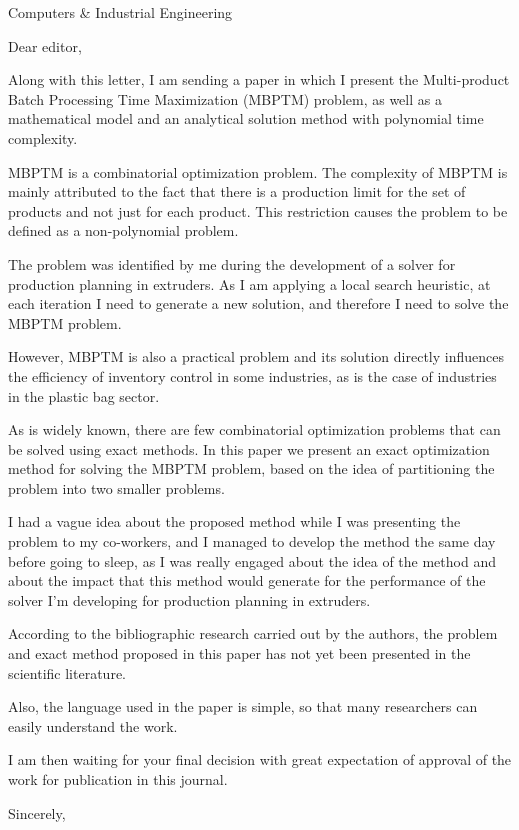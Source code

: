 \documentclass[
  fontsize=11pt,
  paper=a4,
  parskip=half,
  enlargefirstpage=on,    %
  fromalign=right,        %
  fromphone=off,          %
  fromrule=aftername,     %
  addrfield=on,           %
  backaddress=on,         %
  subject=beforeopening,  %
  locfield=narrow,        %
  foldmarks=on,           %
]{scrlttr2}
\begin{document}
\begin{letter}{Computers \& Industrial Engineering}
    \opening{Dear editor,}

	Along with this letter, I am sending a paper in which I present the Multi-product Batch Processing Time Maximization (MBPTM) problem, as well as a mathematical model and an analytical solution method with polynomial time complexity.
	
MBPTM is a combinatorial optimization problem. The complexity of MBPTM is mainly attributed to the fact that there is a production limit for the set of products and not just for each product. This restriction causes the problem to be defined as a non-polynomial problem.

The problem was identified by me during the development of a solver for production planning in extruders. As I am applying a local search heuristic, at each iteration I need to generate a new solution, and therefore I need to solve the MBPTM problem.

However, MBPTM is also a practical problem and its solution directly influences the efficiency of inventory control in some industries, as is the case of industries in the plastic bag sector.

As is widely known, there are few combinatorial optimization problems that can be solved using exact methods. In this paper we present an exact optimization method for solving the MBPTM problem, based on the idea of partitioning the problem into two smaller problems.

I had a vague idea about the proposed method while I was presenting the problem to my co-workers, and I managed to develop the method the same day before going to sleep, as I was really engaged about the idea of the method and about the impact that this method would generate for the performance of the solver I'm developing for production planning in extruders.

According to the bibliographic research carried out by the authors, the problem and exact method proposed in this paper has not yet been presented in the scientific literature.

Also, the language used in the paper is simple, so that many researchers can easily understand the work.

I am then waiting for your final decision with great expectation of approval of the work for publication in this journal.	
    \closing{Sincerely,}
  \end{letter}
\end{document}
